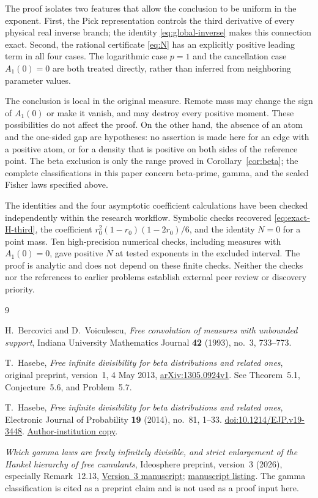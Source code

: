 \documentclass[11pt,a4paper]{article}
\theoremstyle{definition}
\theoremstyle{remark}
\begin{document}
The proof isolates two features that allow the conclusion to be
uniform in the exponent. First, the Pick representation controls
the third derivative of every physical real inverse branch; the
identity \eqref{eq:global-inverse} makes this connection exact.
Second, the rational certificate \eqref{eq:N} has an explicitly
positive leading term in all four cases. The logarithmic case
$p=1$ and the cancellation case $A_1(0)=0$ are both treated
directly, rather than inferred from neighboring parameter values.

The conclusion is local in the original measure. Remote mass may
change the sign of $A_1(0)$ or make it vanish, and may destroy every
positive moment. These possibilities do not affect the proof.
On the other hand, the absence of an atom and the one-sided gap
are hypotheses: no assertion is made here for an edge with a
positive atom, or for a density that is positive on both sides
of the reference point. The beta exclusion is only the range
proved in Corollary~\ref{cor:beta}; the complete classifications
in this paper concern beta-prime, gamma, and the scaled Fisher
laws specified above.

The identities and the four asymptotic coefficient calculations
have been checked independently within the research workflow.
Symbolic checks recovered \eqref{eq:exact-H-third}, the coefficient
$r_0^2(1-r_0)(1-2r_0)/6$, and the identity $N=0$ for a point mass.
Ten high-precision numerical checks, including measures with
$A_1(0)=0$, gave positive $N$ at tested exponents in the excluded
interval. The proof is analytic and does not depend on these finite
checks. Neither the checks nor the references to earlier problems
establish external peer review or discovery priority.

\begin{thebibliography}{9}

H.~Bercovici and D.~Voiculescu,
\emph{Free convolution of measures with unbounded support},
Indiana University Mathematics Journal \textbf{42} (1993), no.~3,
733--773.

T.~Hasebe,
\emph{Free infinite divisibility for beta distributions and related ones},
original preprint, version~1, 4 May 2013,
\href{https://arxiv.org/abs/1305.0924v1}{arXiv:1305.0924v1}.
See Theorem~5.1, Conjecture~5.6, and Problem~5.7.

T.~Hasebe,
\emph{Free infinite divisibility for beta distributions and related ones},
Electronic Journal of Probability \textbf{19} (2014), no.~81, 1--33.
\href{https://doi.org/10.1214/EJP.v19-3448}{doi:10.1214/EJP.v19-3448}.
\href{https://eprints.lib.hokudai.ac.jp/repo/huscap/all/57180/EJP_19_81.pdf}{Author-institution copy}.

\emph{Which gamma laws are freely infinitely divisible, and strict
enlargement of the Hankel hierarchy of free cumulants},
Ideosphere preprint, version~3 (2026), especially Remark~12.13,
\href{https://ideosphere.ai/papers/hankel-fid-v3.pdf}{Version~3 manuscript};
\href{https://ideosphere.ai/papers/hankel-fid}{manuscript listing}.
The gamma classification is cited as a preprint claim and is not
used as a proof input here.

\end{thebibliography}
\end{document}
